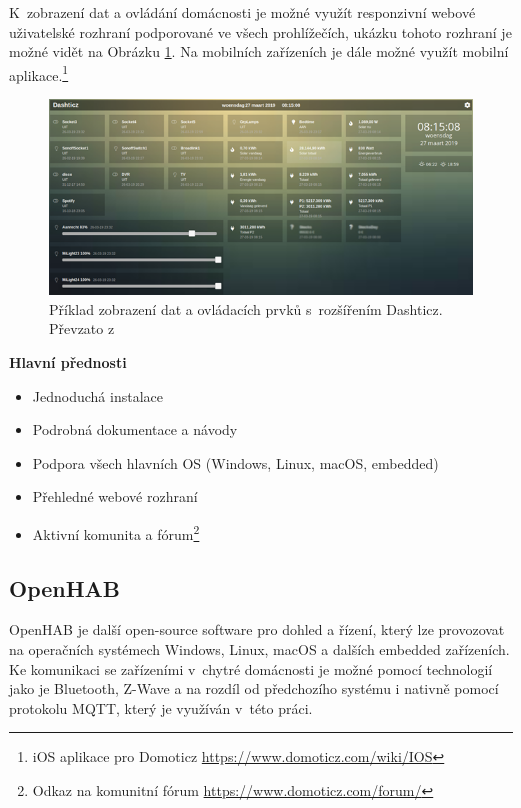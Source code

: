 K~zobrazení dat a ovládání domácnosti je možné využít responzivní webové uživatelské rozhraní podporované ve všech prohlížečích, ukázku tohoto rozhraní je možné vidět na Obrázku \ref{domoticzImage}. Na mobilních zařízeních je dále možné využít mobilní aplikace.\footnote{iOS aplikace pro Domoticz \url{https://www.domoticz.com/wiki/IOS}}

\begin{figure}[H]
	\centering
	\includegraphics[width=\textwidth]{obrazky-figures/smartHomeSystems/domoticz.png}
	\caption{Příklad zobrazení dat a ovládacích prvků s~rozšířením Dashticz. Převzato z~\cite{Domoticz}}
	\label{domoticzImage}
\end{figure}

\noindent\textbf{Hlavní přednosti}
\begin{itemize}
  \item Jednoduchá instalace
  \item Podrobná dokumentace a návody
  \item Podpora všech hlavních OS (Windows, Linux, macOS, embedded)
  \item Přehledné webové rozhraní
  \item Aktivní komunita a fórum\footnote{Odkaz na komunitní fórum \url{https://www.domoticz.com/forum/}}
  \end{itemize}

\subsection*{OpenHAB}
OpenHAB je další open-source software pro dohled a řízení, který lze provozovat na operačních systémech Windows, Linux, macOS a dalších embedded zařízeních. Ke komunikaci se zařízeními v~chytré domácnosti je možné pomocí technologií jako je Bluetooth, Z-Wave a na rozdíl od předchozího systému i nativně pomocí protokolu MQTT, který je využíván v~této práci.

